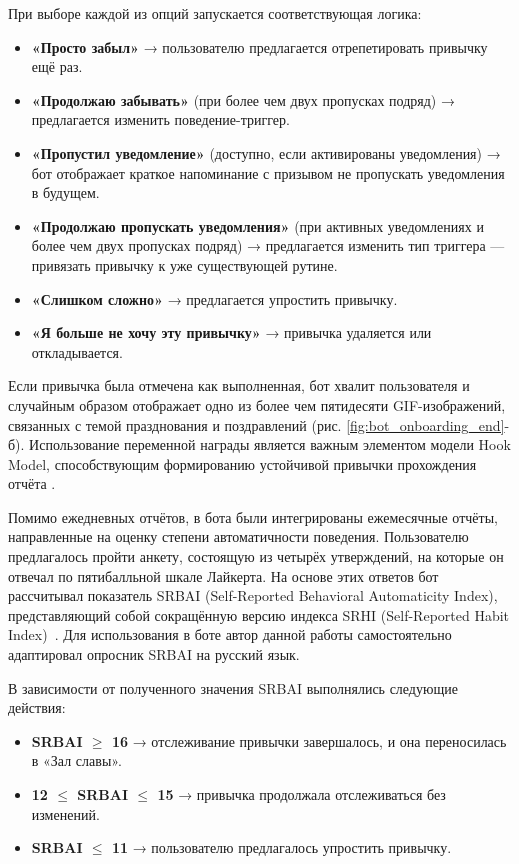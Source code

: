 \documentclass[pdflatex,sn-mathphys-num]{sn-jnl}%
\theoremstyle{thmstyleone}%
\theoremstyle{thmstyletwo}%
\theoremstyle{thmstylethree}%
\begin{document}
При выборе каждой из опций запускается соответствующая логика:

\begin{itemize}
    \item \textbf{«Просто забыл»} → пользователю предлагается отрепетировать привычку ещё раз.
    \item \textbf{«Продолжаю забывать»} (при более чем двух пропусках подряд) → предлагается изменить поведение-триггер.
    \item \textbf{«Пропустил уведомление»} (доступно, если активированы уведомления) → бот отображает краткое напоминание с призывом не пропускать уведомления в будущем.
    \item \textbf{«Продолжаю пропускать уведомления»} (при активных уведомлениях и более чем двух пропусках подряд) → предлагается изменить тип триггера — привязать привычку к уже существующей рутине.
    \item \textbf{«Слишком сложно»} → предлагается упростить привычку.
    \item \textbf{«Я больше не хочу эту привычку»} → привычка удаляется или откладывается.
\end{itemize}

Если привычка была отмечена как выполненная, бот хвалит пользователя и случайным образом отображает одно из более чем пятидесяти GIF-изображений, связанных с темой празднования и поздравлений (рис. \ref{fig:bot_onboarding_end}-б). Использование переменной награды является важным элементом модели Hook Model, способствующим формированию устойчивой привычки прохождения отчёта \cite{eyal_hooked_2014}.

Помимо ежедневных отчётов, в бота были интегрированы ежемесячные отчёты, направленные на оценку степени автоматичности поведения. Пользователю предлагалось пройти анкету, состоящую из четырёх утверждений, на которые он отвечал по пятибалльной шкале Лайкерта. На основе этих ответов бот рассчитывал показатель SRBAI (Self-Reported Behavioral Automaticity Index), представляющий собой сокращённую версию индекса SRHI (Self-Reported Habit Index)~\cite{gardner_towards_2012}. Для использования в боте автор данной работы самостоятельно адаптировал опросник SRBAI на русский язык.

В зависимости от полученного значения SRBAI выполнялись следующие действия:

\begin{itemize}
    \item \textbf{SRBAI $\geq$ 16} → отслеживание привычки завершалось, и она переносилась в «Зал славы».
    \item \textbf{12 $\leq$ SRBAI $\leq$ 15} → привычка продолжала отслеживаться без изменений.
    \item \textbf{SRBAI $\leq$ 11} → пользователю предлагалось упростить привычку.
\end{itemize}
\end{document}
